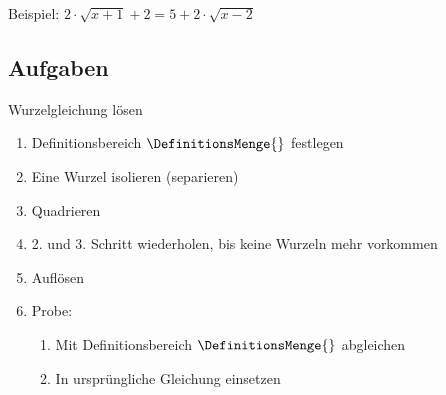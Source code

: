 \newpage


Beispiel: $2\cdot{}\sqrt{x+1} + 2 = 5 + 2\cdot{}\sqrt{x-2}$


\subsection*{Aufgaben}


\begin{rezept}{Wurzelgleichung lösen}{}
  \begin{enumerate}
  \item Definitionsbereich $\DefinitionsMenge{}$ festlegen
  \item Eine Wurzel isolieren (separieren)
  \item Quadrieren
  \item 2. und 3. Schritt wiederholen, bis keine Wurzeln mehr
    vorkommen
  \item Auflösen
  \item Probe:
    \begin{enumerate}
    \item Mit Definitionsbereich $\DefinitionsMenge{}$ abgleichen
    \item In ursprüngliche Gleichung einsetzen
    \end{enumerate}
  \end{enumerate}
\end{rezept}



\newpage

